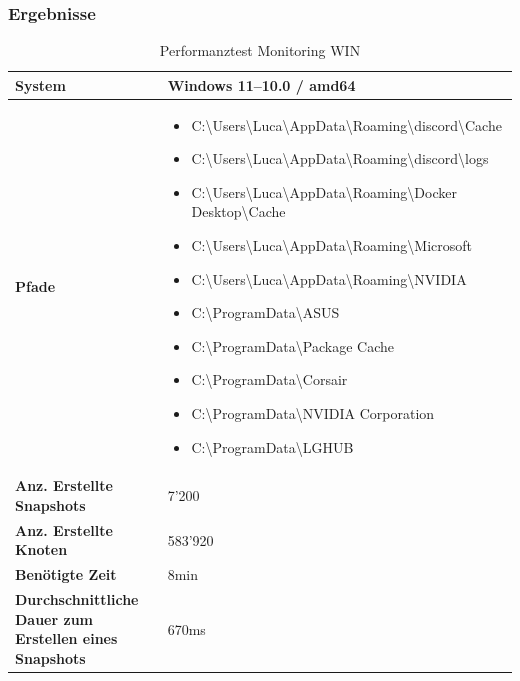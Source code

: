 \documentclass[a4paper,12pt]{report}
\begin{document}
    \subsubsection{Ergebnisse}
    \begin{table}[h!]
        \centering
        \setlength{\leftmargini}{0.8cm}
        \begin{tabular}{|p{5cm}|p{10cm}|}
            \hline
            \textbf{System}                                               & Windows 11--10.0 / amd64 \\ \hline
            \textbf{Pfade} &
            \begin{itemize}
                \item C:\textbackslash Users\textbackslash Luca\textbackslash AppData\textbackslash Roaming\textbackslash discord\textbackslash Cache
                \item C:\textbackslash Users\textbackslash Luca\textbackslash AppData\textbackslash Roaming\textbackslash discord\textbackslash logs
                \item C:\textbackslash Users\textbackslash Luca\textbackslash AppData\textbackslash Roaming\textbackslash Docker Desktop\textbackslash Cache
                \item C:\textbackslash Users\textbackslash Luca\textbackslash AppData\textbackslash Roaming\textbackslash Microsoft
                \item C:\textbackslash Users\textbackslash Luca\textbackslash AppData\textbackslash Roaming\textbackslash NVIDIA
                \item C:\textbackslash ProgramData\textbackslash ASUS
                \item C:\textbackslash ProgramData\textbackslash Package Cache
                \item C:\textbackslash ProgramData\textbackslash Corsair
                \item C:\textbackslash ProgramData\textbackslash NVIDIA Corporation
                \item C:\textbackslash ProgramData\textbackslash LGHUB
            \end{itemize}
            \\ \hline
            \textbf{Anz. Erstellte Snapshots}                             & 7'200                    \\ \hline
            \textbf{Anz. Erstellte Knoten}                                & 583'920                  \\ \hline
            \textbf{Benötigte Zeit}                                       & 8min                     \\ \hline
            \textbf{Durchschnittliche Dauer zum Erstellen eines Snapshots} & 670ms                    \\ \hline
        \end{tabular}
        \caption{Performanztest Monitoring WIN}\label{tab:perf-monitoring-win}
    \end{table}
\end{document}
